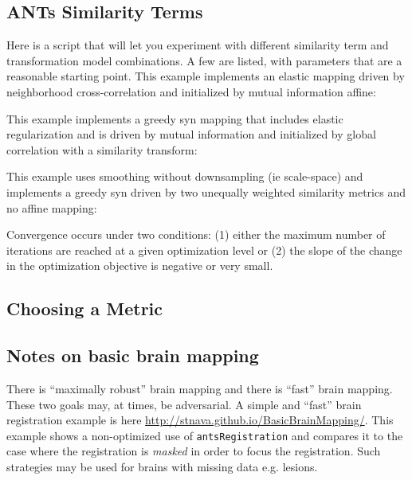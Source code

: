 \documentclass{InsightArticle}
\begin{document}
\subsection{ANTs Similarity Terms}
Here is a script that will let you experiment with different similarity term 
and transformation model combinations.  A few are listed, with parameters 
that are a reasonable starting point.  This example implements an
elastic mapping driven by neighborhood cross-correlation and initialized by mutual information affine:

This example implements a greedy syn mapping that includes elastic regularization and is driven by mutual
information and initialized by global correlation with a similarity transform:

This example uses smoothing without downsampling (ie scale-space) and
implements a greedy syn driven by two unequally weighted similarity metrics and no affine mapping:

Convergence occurs under two conditions: (1) either the maximum number of 
iterations are reached at a given optimization level or (2) the slope 
of the change in the optimization objective is negative or very small. 


\subsection{Choosing a Metric}




\subsection{Notes on basic brain mapping}
There is ``maximally robust'' brain mapping and there is ``fast''
brain mapping.  These two goals may, at times, be adversarial.  
A simple and ``fast'' brain registration example is here
\href{http://stnava.github.io/BasicBrainMapping/}{http://stnava.github.io/BasicBrainMapping/}.
This example shows a non-optimized use of \texttt{antsRegistration}
and compares it to the case where the registration is \textit{masked}
in order to focus the registration.  Such strategies may be used for
brains with missing data e.g. lesions.
\end{document}
